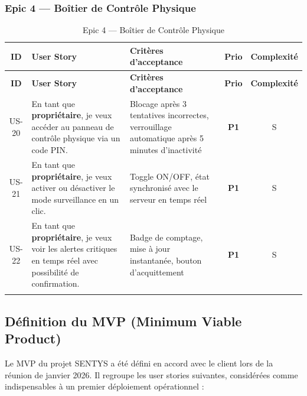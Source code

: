 \documentclass[12pt,a4paper]{article}
\begin{document}
\subsubsection{Epic 4 --- Boîtier de Contrôle Physique}

\begin{longtable}{|c|p{3.8cm}|p{6.3cm}|c|c|}
\hline
\textbf{ID} & \textbf{User Story} & \textbf{Critères d'acceptance} & \textbf{Prio} & \textbf{Complexité} \\
\hline
\endfirsthead
\hline
\textbf{ID} & \textbf{User Story} & \textbf{Critères d'acceptance} & \textbf{Prio} & \textbf{Complexité} \\
\hline
\endhead
US-20 & En tant que \textbf{propriétaire}, je veux accéder au panneau de contrôle physique via un code PIN. & Blocage après 3 tentatives incorrectes, verrouillage automatique après 5 minutes d'inactivité & \textbf{P1} & S \\
\hline
US-21 & En tant que \textbf{propriétaire}, je veux activer ou désactiver le mode surveillance en un clic. & Toggle ON/OFF, état synchronisé avec le serveur en temps réel & \textbf{P1} & S \\
\hline
US-22 & En tant que \textbf{propriétaire}, je veux voir les alertes critiques en temps réel avec possibilité de confirmation. & Badge de comptage, mise à jour instantanée, bouton d'acquittement & \textbf{P1} & S \\
\hline
\caption{Epic 4 --- Boîtier de Contrôle Physique}
\end{longtable}
\subsection{Définition du MVP (Minimum Viable Product)}

Le MVP du projet SENTYS a été défini en accord avec le client lors de la réunion de janvier 2026. Il regroupe les user stories suivantes, considérées comme indispensables à un premier déploiement opérationnel :
\end{document}
